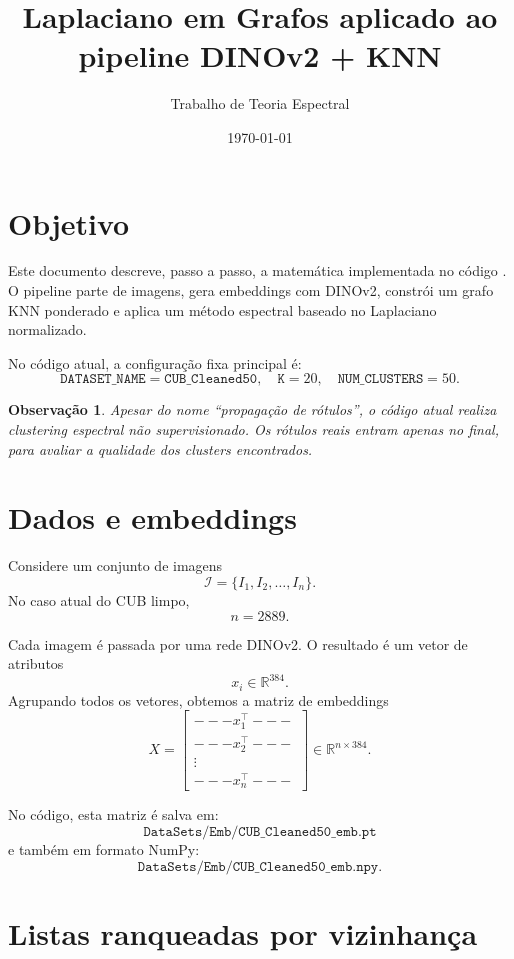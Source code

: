 \documentclass[11pt,a4paper]{article}
\title{Laplaciano em Grafos aplicado ao pipeline DINOv2 + KNN}
\author{Trabalho de Teoria Espectral}
\date{\today}
\newtheorem{remark}{Observação}
\begin{document}
\maketitle

\section{Objetivo}

Este documento descreve, passo a passo, a matemática implementada no código
.
O pipeline parte de imagens, gera embeddings com DINOv2, constrói um grafo KNN
ponderado e aplica um método espectral baseado no Laplaciano normalizado.

No código atual, a configuração fixa principal é:
\[
\texttt{DATASET\_NAME}=\texttt{CUB\_Cleaned50}, \quad
\texttt{K}=20, \quad
\texttt{NUM\_CLUSTERS}=50.
\]

\begin{remark}
Apesar do nome ``propagação de rótulos'', o código atual realiza clustering
espectral não supervisionado. Os rótulos reais entram apenas no final, para
avaliar a qualidade dos clusters encontrados.
\end{remark}

\section{Dados e embeddings}

Considere um conjunto de imagens
\[
\mathcal{I}=\{I_1,I_2,\ldots,I_n\}.
\]
No caso atual do CUB limpo,
\[
n=2889.
\]

Cada imagem é passada por uma rede DINOv2. O resultado é um vetor de atributos
\[
x_i \in \mathbb{R}^{384}.
\]
Agrupando todos os vetores, obtemos a matriz de embeddings
\[
X =
\begin{bmatrix}
--- x_1^\top ---\\
--- x_2^\top ---\\
\vdots\\
--- x_n^\top ---
\end{bmatrix}
\in \mathbb{R}^{n\times 384}.
\]

No código, esta matriz é salva em:
\[
\texttt{DataSets/Emb/CUB\_Cleaned50\_emb.pt}
\]
e também em formato NumPy:
\[
\texttt{DataSets/Emb/CUB\_Cleaned50\_emb.npy}.
\]

\section{Listas ranqueadas por vizinhança}
\end{document}
